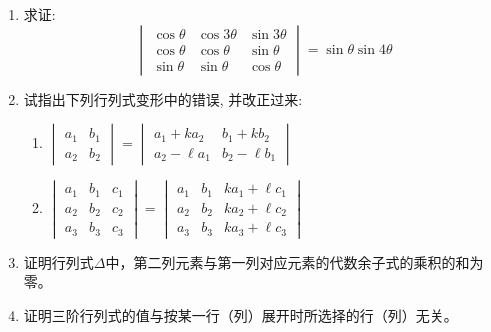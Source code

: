 \begin{enumerate}
\item 求证:
$$
\begin{vmatrix}
\cos \theta & \cos 3 \theta & \sin 3 \theta \\
\cos \theta & \cos \theta & \sin \theta \\
\sin \theta & \sin \theta & \cos \theta
\end{vmatrix}=\sin \theta \sin 4 \theta
$$
\item 试指出下列行列式变形中的错误, 并改正过来:
\begin{enumerate}
    \item $\begin{vmatrix}
        a_1&b_1\\a_2&b_2
    \end{vmatrix}=\begin{vmatrix}
        a_1+ka_2&b_1+kb_2\\a_2-\ell a_1&b_2-\ell b_1
    \end{vmatrix}$
    \item $\begin{vmatrix}
        a_{1} & b_{1} & c_{1} \\ a_{2} & b_{2} & c_{2} \\ a_{3} & b_{3} & c_{3}
    \end{vmatrix}=\begin{vmatrix}
        a_{1} & b_{1} & ka_1+\ell c_{1} \\ a_{2} & b_{2} & ka_2+\ell c_{2} \\ a_{3} & b_{3} & ka_3+\ell c_{3}
    \end{vmatrix}$
\end{enumerate}

\item  证明行列式$\Delta$中，第二列元素与第一列对应元素的代数余子式的乘积的和为零。
\item 证明三阶行列式的值与按某一行（列）展开时所选择的行（列）无关。


\end{enumerate}
